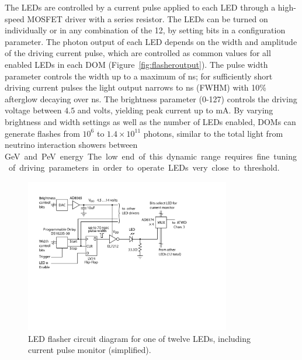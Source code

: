 The LEDs are controlled by a current pulse applied to each LED through
a high-speed MOSFET driver with a series resistor. The LEDs can be turned on individually or in any
combination of the 12, by setting bits in a configuration parameter.
The photon output of each LED depends on the width and
amplitude of the driving current pulse, which are controlled as common
values for all enabled LEDs in each DOM (Figure~\ref{fig:flasheroutput}).  
The pulse width parameter controls the width up to a maximum of \unit[70]{ns}; 
for sufficiently short driving current pulses the light output narrows to \unit[6]{ns} (FWHM) with
10\% afterglow decaying over \unit[15--20]{ns}.
The brightness parameter (0-127) controls the driving voltage between $4.5$ and \unit[15]{volts}, yielding
peak current up to \unit[300]{mA}.
By varying brightness and width settings as well as the number of LEDs enabled, DOMs can generate flashes
from $10^6$ to $1.4\times10^{11}$ photons, similar to the total light from
neutrino interaction showers between \unit[7]GeV and \unit[1]PeV energy.
The low end of this dynamic range requires fine tuning of driving
parameters in order to operate LEDs very close to threshold.

\begin{figure}[h]
 \centering
 \includegraphics[width=0.8\textwidth]{graphics/dom/functional/domfig4-FlasherDiagram.pdf}
 \caption{LED flasher circuit diagram for one of twelve LEDs, including current pulse monitor (simplified).}
 \label{fig:flasherdiagram}
\end{figure}

